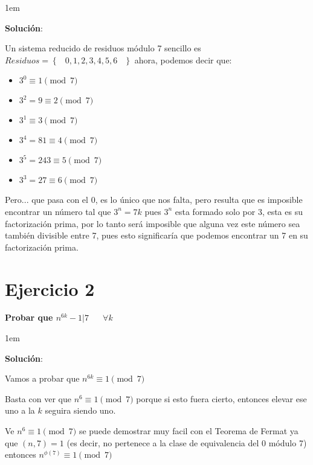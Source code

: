 \documentclass[12pt, fleqn]{article}                             %
\newenvironment{SmallIndentation}[1][0.75em]                    %
    {\begin{adjustwidth}{#1}{}\begin{footnotesize}}                 %
    {\end{footnotesize}\end{adjustwidth}}                           %
\DeclareMathOperator \Space {\quad}                             %
\DeclareMathOperator \MiniSpace {\;}                            %
\newcommand{\Set}[1]{\left\{ \MiniSpace #1 \MiniSpace \right\}} %
\begin{document}
    \begin{SmallIndentation}[1em]
        \textbf{Solución}:
        
        Un sistema reducido de residuos módulo 7 sencillo es $Residuos = \Set{0, 1, 2, 3, 4, 5, 6}$
        ahora, podemos decir que:

        \begin{itemize}
            \item $3^0 \equiv 1         \pmod{7}$
            \item $3^2 = 9 \equiv 2     \pmod{7}$
            \item $3^1 \equiv 3         \pmod{7}$
            \item $3^4 = 81 \equiv 4    \pmod{7}$
            \item $3^5 = 243 \equiv 5   \pmod{7}$
            \item $3^3 = 27 \equiv 6    \pmod{7}$
        \end{itemize}

        Pero... que pasa con el 0, es lo único que nos falta, pero resulta que es imposible 
        encontrar un número tal que $3^n = 7k$ pues $3^n$ esta formado solo por 3, esta es
        su factorización prima, por lo tanto será imposible que alguna vez este número sea
        también divisible entre 7, pues esto significaría que podemos encontrar un 7 en su
        factorización prima.
    
    \end{SmallIndentation}
        

\section{Ejercicio 2}

    \textbf{Probar que $n^{6k} -1 |7 \Space \forall k$}

    \begin{SmallIndentation}[1em]
        \textbf{Solución}:
        
        Vamos a probar que $n^{6k} \equiv 1 \pmod{7}$

        Basta con ver que $n^6 \equiv 1 \pmod{7}$ porque si esto fuera cierto, entonces
        elevar ese uno a la $k$ seguira siendo uno.

        Ve $n^6 \equiv 1 \pmod{7}$ se puede demostrar muy facil con el Teorema de Fermat
        ya que $(n, 7) = 1$ (es decir, no pertenece a la clase de equivalencia del 0 módulo 7)
        entonces $n^{\phi(7)} \equiv 1 \pmod{7}$
    
    \end{SmallIndentation}
\end{document}
